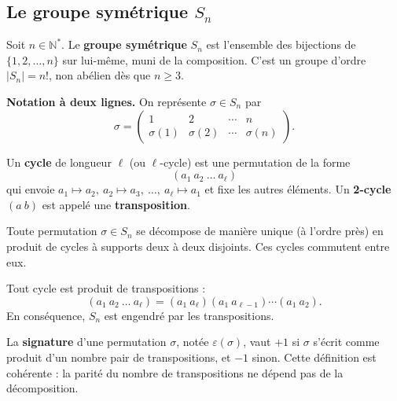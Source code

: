 \subsection{Le groupe symétrique $S_n$}

\begin{definition}[Permutations]
Soit $n \in \mathbb{N}^*$. Le \textbf{groupe symétrique} $S_n$ est l'ensemble des bijections de $\{1, 2, \dots, n\}$ sur lui-même, muni de la composition. C'est un groupe d'ordre $|S_n| = n!$, non abélien dès que $n \ge 3$.
\end{definition}

\medskip

\noindent\textbf{Notation à deux lignes.} On représente $\sigma \in S_n$ par
\[ \sigma = \begin{pmatrix} 1 & 2 & \cdots & n \\ \sigma(1) & \sigma(2) & \cdots & \sigma(n) \end{pmatrix}. \]

\begin{definition}
Un \textbf{cycle} de longueur $\ell$ (ou $\ell$-cycle) est une permutation de la forme
\[ (a_1\ a_2\ \dots\ a_\ell) \]
qui envoie $a_1 \mapsto a_2,\ a_2 \mapsto a_3,\ \dots,\ a_\ell \mapsto a_1$ et fixe les autres éléments.
Un \textbf{2-cycle} $(a\ b)$ est appelé une \textbf{transposition}.
\end{definition}

\begin{theoreme}
Toute permutation $\sigma \in S_n$ se décompose de manière unique (à l'ordre près) en produit de cycles à supports deux à deux disjoints. Ces cycles commutent entre eux.
\end{theoreme}

\begin{theoreme}
Tout cycle est produit de transpositions :
\[ (a_1\ a_2\ \dots\ a_\ell) = (a_1\ a_\ell)(a_1\ a_{\ell-1}) \cdots (a_1\ a_2). \]
En conséquence, $S_n$ est engendré par les transpositions.
\end{theoreme}

\begin{definition}[Signature]
La \textbf{signature} d'une permutation $\sigma$, notée $\varepsilon(\sigma)$, vaut $+1$ si $\sigma$ s'écrit comme produit d'un nombre pair de transpositions, et $-1$ sinon. Cette définition est cohérente : la parité du nombre de transpositions ne dépend pas de la décomposition.
\end{definition}

